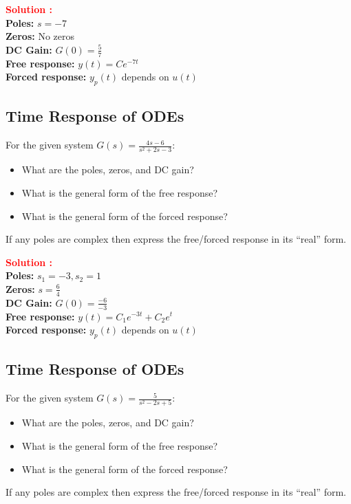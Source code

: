 \documentclass[12pt]{article}
\begin{document}
\textbf{\textcolor{red}{Solution :}} \\
\textbf{Poles:} \(s = -7\) \\
\textbf{Zeros:} No zeros \\
\textbf{DC Gain:} \(G(0) = \frac{5}{7}\) \\
\textbf{Free response:} \(y(t) = C e^{-7t}\) \\
\textbf{Forced response:} \(y_p(t)\) depends on \(u(t)\) \\

\clearpage
\subsection{Time Response of ODEs}

For the given system \(G(s) = \frac{4s-6}{s^2+2s-3}\):
\begin{itemize}
    \item  What are the poles, zeros, and DC gain?
    \item  What is the general form of the free response?
    \item  What is the general form of the forced response? 
\end{itemize}
If any poles are complex then express the free/forced response in its “real” form.

\textbf{\textcolor{red}{Solution :}} \\
\textbf{Poles:} \(s_1 = -3, s_2 = 1\) \\
\textbf{Zeros:} \(s = \frac{6}{4}\) \\
\textbf{DC Gain:} \(G(0) = \frac{-6}{-3}\) \\
\textbf{Free response:} \(y(t) = C_1 e^{-3t} + C_2 e^{t}\) \\
\textbf{Forced response:} \(y_p(t)\) depends on \(u(t)\) \\

\clearpage
\subsection{Time Response of ODEs}

For the given system \(G(s) = \frac{5}{s^2-2s+5}\):
\begin{itemize}
    \item  What are the poles, zeros, and DC gain?
    \item  What is the general form of the free response?
    \item  What is the general form of the forced response? 
\end{itemize}
If any poles are complex then express the free/forced response in its “real” form.
\end{document}
